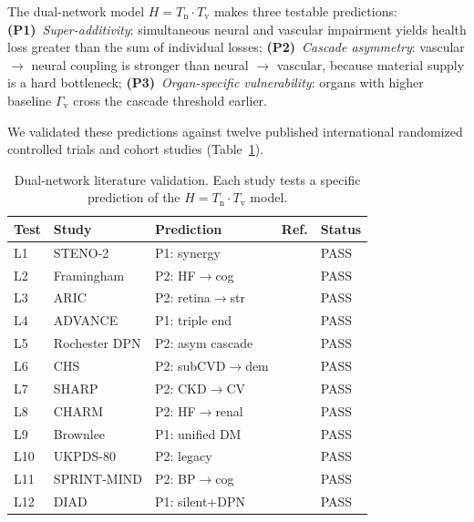 ﻿\documentclass[aps,pre,twocolumn,superscriptaddress,floatfix]{revtex4-2}
\newcommand{\Gv}{\Gamma_{\mathrm{v}}}
\newcommand{\Tv}{T_{\mathrm{v}}}
\newcommand{\Tn}{T_{\mathrm{n}}}
\begin{document}
The dual-network model $H = \Tn \cdot \Tv$ makes three
testable predictions:
\textbf{(P1)}~\emph{Super-additivity}: simultaneous
neural and vascular impairment yields health loss
greater than the sum of individual losses;
\textbf{(P2)}~\emph{Cascade asymmetry}: vascular
$\to$ neural coupling is stronger than neural $\to$
vascular, because material supply is a hard bottleneck;
\textbf{(P3)}~\emph{Organ-specific vulnerability}:
organs with higher baseline $\Gv$ cross the cascade
threshold earlier.

We validated these predictions against twelve published
international randomized controlled trials and cohort
studies (Table~\ref{tab:literature}).

\clearpage
\begin{table}[htbp]
\caption{Dual-network literature validation.
Each study tests a specific prediction of the
$H = \Tn \cdot \Tv$ model.}
\label{tab:literature}
\begin{ruledtabular}
\begin{tabular}{lllll}
Test & Study & Prediction & Ref. & Status \\
\hline
L1  & STENO-2        & P1: synergy       & \cite{Gaede2008}    & PASS \\
L2  & Framingham     & P2: HF$\to$cog    & \cite{Jefferson2015}& PASS \\
L3  & ARIC           & P2: retina$\to$str& \cite{Wong2002}     & PASS \\
L4  & ADVANCE        & P1: triple end    & \cite{Patel2007}    & PASS \\
L5  & Rochester DPN  & P2: asym cascade  & \cite{Dyck1993}     & PASS \\
L6  & CHS            & P2: subCVD$\to$dem& \cite{Newman2005}   & PASS \\
L7  & SHARP          & P2: CKD$\to$CV    & \cite{Baigent2011}  & PASS \\
L8  & CHARM          & P2: HF$\to$renal  & \cite{McMurray2003} & PASS \\
L9  & Brownlee       & P1: unified DM    & \cite{brownlee2001} & PASS \\
L10 & UKPDS-80       & P2: legacy        & \cite{Holman2008}   & PASS \\
L11 & SPRINT-MIND    & P2: BP$\to$cog    & \cite{Williamson2019}& PASS \\
L12 & DIAD           & P1: silent+DPN    & \cite{Young2009}    & PASS \\
\end{tabular}
\end{ruledtabular}
\end{table}
\end{document}
